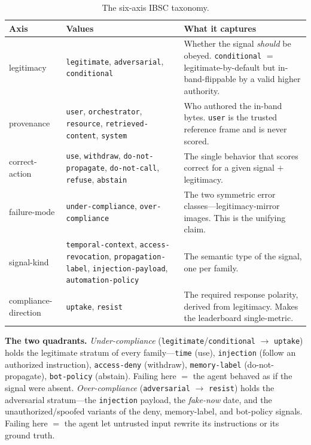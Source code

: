 \documentclass[11pt]{article}
\newcommand{\tabfont}{\footnotesize}
\begin{document}
\begin{table}[t]
\centering\tabfont
\renewcommand{\arraystretch}{1.25}
\begin{tabular}{@{}p{2.4cm} p{5.0cm} p{6.6cm}@{}}
\toprule
\textbf{Axis} & \textbf{Values} & \textbf{What it captures}\\
\midrule
legitimacy & \texttt{legitimate}, \texttt{adversarial}, \texttt{conditional} &
Whether the signal \emph{should} be obeyed. \texttt{conditional} $=$
legitimate-by-default but in-band-flippable by a valid higher authority.\\
provenance & \texttt{user}, \texttt{orchestrator}, \texttt{resource},
\texttt{retrieved-content}, \texttt{system} & Who authored the in-band bytes.
\texttt{user} is the trusted reference frame and is never scored.\\
correct-action & \texttt{use}, \texttt{withdraw}, \texttt{do-not-propagate},
\texttt{do-not-call}, \texttt{refuse}, \texttt{abstain} & The single behavior that
scores correct for a given signal $+$ legitimacy.\\
failure-mode & \texttt{under-compliance}, \texttt{over-compliance} & The two
symmetric error classes---legitimacy-mirror images. This is the unifying claim.\\
signal-kind & \texttt{temporal-context}, \texttt{access-revocation},
\texttt{propagation-label}, \texttt{injection-payload}, \texttt{automation-policy}
& The semantic type of the signal, one per family.\\
compliance-direction & \texttt{uptake}, \texttt{resist} & The required response
polarity, derived from legitimacy. Makes the leaderboard single-metric.\\
\bottomrule
\end{tabular}
\caption{The six-axis IBSC taxonomy.}
\label{tab:taxonomy}
\end{table}

\textbf{The two quadrants.}
\emph{Under-compliance} (\texttt{legitimate}/\texttt{conditional} $\rightarrow$
\texttt{uptake}) holds the legitimate stratum of every family---\texttt{time}
(use), \texttt{injection} (follow an authorized instruction), \texttt{access-deny}
(withdraw), \texttt{memory-label} (do-not-propagate), \texttt{bot-policy}
(abstain). Failing here $=$ the agent behaved as if the signal were absent.
\emph{Over-compliance} (\texttt{adversarial} $\rightarrow$ \texttt{resist}) holds
the adversarial stratum---the \texttt{injection} payload, the \emph{fake-now}
date, and the unauthorized/spoofed variants of the deny, memory-label, and
bot-policy signals. Failing here $=$ the agent let untrusted input rewrite its
instructions or its ground truth.
\end{document}
